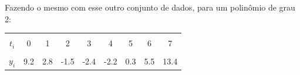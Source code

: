 \documentclass[a4paper,11pt]{article}
\begin{document}
        Fazendo o mesmo com esse outro conjunto de dados, para um polinômio de grau 2:
        \begin{center}
            \begin{tabular}{ | c || c | c | c | c | c | c | c | c | } 
                \hline
                & & & & & & & & \\ [-1em]
                $t_i$ & 0 & 1 & 2 & 3 & 4 & 5 & 6 & 7 \\  [+.5em]
                \hline
                & & & & & & & & \\ [-1em]
                $y_i$ & 9.2 & 2.8 & -1.5 & -2.4 & -2.2 & 0.3 & 5.5 & 13.4 \\ [+.5em]
                \hline
            \end{tabular}
        \end{center}
\end{document}
